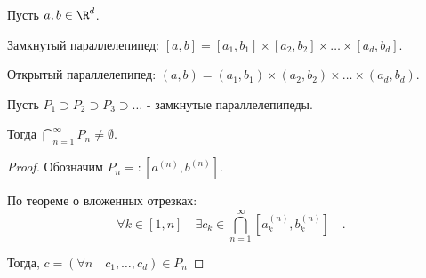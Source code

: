 

\begin{definition} \thmslashn 

    Пусть $a, b\in \R^{d}$.

    Замкнутый параллелепипед: $[a, b] = [a_1, b_1] \times [a_2, b_2] \times\ldots \times [a_{d}, b_{d}]$.

    Открытый параллелепипед: $(a, b) = (a_1, b_1) \times (a_2, b_2) \times \ldots \times (a_{d}, b_{d})$.
\end{definition}

\begin{theorem} \thmslashn

    Пусть $P_1 \supset P_2 \supset P_3 \supset \ldots$ - замкнутые параллелепипеды.

    Тогда $\bigcap\limits_{n=1}^{\infty} P_{n} \neq \emptyset $.

    \begin{proof} \thmslashn
    
        Обозначим $P_{n} =: [a^{(n)}, b^{(n)}]$.

        По теореме о вложенных отрезках:
        \[ \forall{k\in [1, n]}\quad \exists{c_{k}\in \bigcap_{n=1}^{\infty} [a_{k}^{(n)}, b_{k}^{(n)}] }\quad  .\] 

        Тогда, $c = (\forall{n}\quad c_1, \ldots, c_{d})\in P_{n}$
    \end{proof}
\end{theorem}

